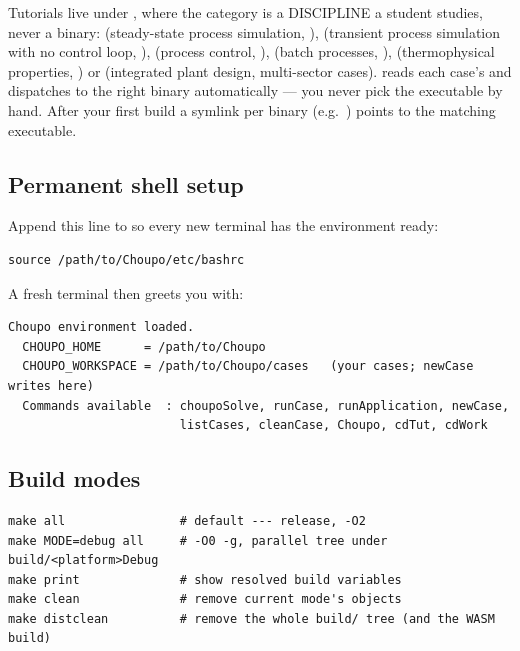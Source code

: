 \documentclass[11pt,a4paper]{article}
\begin{document}
Tutorials live under , where
the category is a DISCIPLINE a student studies, never a binary: 
(steady-state process simulation, ), 
(transient process simulation with no control loop, ),
 (process control, ),  (batch
processes, ),  (thermophysical properties,
) or  (integrated plant design, multi-sector
cases).   reads each case's
 and dispatches to the right binary
automatically --- you never pick the executable by hand.  After your
first build a symlink per binary (e.g.\ ) points to
the matching  executable.

\subsection{Permanent shell setup}

Append this line to  so every new terminal
has the environment ready:

\begin{lstlisting}
source /path/to/Choupo/etc/bashrc
\end{lstlisting}

A fresh terminal then greets you with:

\begin{lstlisting}
Choupo environment loaded.
  CHOUPO_HOME      = /path/to/Choupo
  CHOUPO_WORKSPACE = /path/to/Choupo/cases   (your cases; newCase writes here)
  Commands available  : choupoSolve, runCase, runApplication, newCase,
                        listCases, cleanCase, Choupo, cdTut, cdWork
\end{lstlisting}

\subsection{Build modes}

\begin{lstlisting}
make all                # default --- release, -O2
make MODE=debug all     # -O0 -g, parallel tree under build/<platform>Debug
make print              # show resolved build variables
make clean              # remove current mode's objects
make distclean          # remove the whole build/ tree (and the WASM build)
\end{lstlisting}
\end{document}
